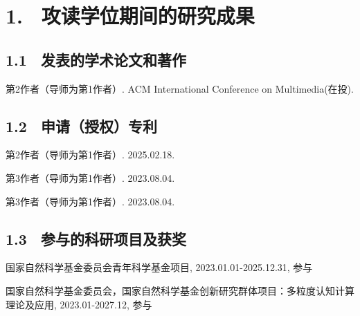\section{1. \ 攻读学位期间的研究成果}
\subsection{1.1 \ 发表的学术论文和著作}
\noindent [1]
\begin{minipage}[t]{0.96\linewidth}
第2作者（导师为第1作者）. ACM International Conference on Multimedia(在投).
\end{minipage}
\vspace{0cm}

\subsection{1.2 \ 申请（授权）专利}
\noindent [1]
\begin{minipage}[t]{0.96\linewidth}
    第2作者（导师为第1作者）. 2025.02.18.
\end{minipage}

\noindent [2]
\begin{minipage}[t]{0.96\linewidth}
    第3作者（导师为第1作者）. 2023.08.04.
\end{minipage}

\noindent [3]
\begin{minipage}[t]{0.96\linewidth}
    第3作者（导师为第1作者）. 2023.08.04.
\end{minipage}

\subsection{1.3 \ 参与的科研项目及获奖}
\noindent [1]
\begin{minipage}[t]{0.96\linewidth}
    国家自然科学基金委员会青年科学基金项目, 2023.01.01-2025.12.31, 参与
\end{minipage}
\noindent [2]
\begin{minipage}[t]{0.96\linewidth}
    国家自然科学基金委员会，国家自然科学基金创新研究群体项目：多粒度认知计算理论及应用, 2023.01-2027.12, 参与
\end{minipage}
